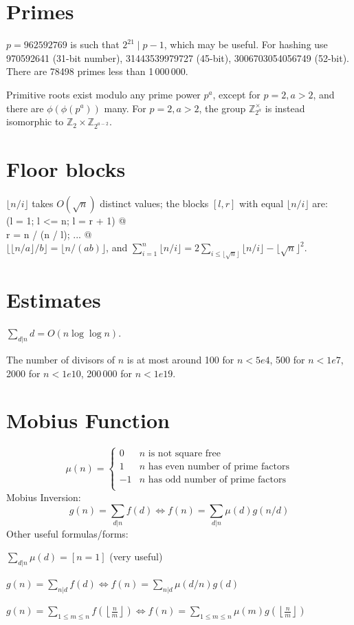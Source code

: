 \section{Primes}
	$p=962592769$ is such that $2^{21} \mid p-1$, which may be useful. For hashing
	use 970592641 (31-bit number), 31443539979727 (45-bit), 3006703054056749
	(52-bit). There are 78498 primes less than 1\,000\,000.

	Primitive roots exist modulo any prime power $p^a$, except for $p = 2, a > 2$, and there are $\phi(\phi(p^a))$ many.
	For $p = 2, a > 2$, the group $\mathbb Z_{2^a}^\times$ is instead isomorphic to $\mathbb Z_2 \times \mathbb Z_{2^{a-2}}$.

\section{Floor blocks}
	$\lfloor n/i \rfloor$ takes $O(\sqrt n)$ distinct values; the blocks $[l, r]$ with equal $\lfloor n/i \rfloor$ are:\\
	\verb@for (l = 1; l <= n; l = r + 1) {@\\
	\verb@  r = n / (n / l); ... }@\\
	$\lfloor \lfloor n/a \rfloor / b \rfloor = \lfloor n/(ab) \rfloor$, and
	$\sum_{i=1}^{n} \lfloor n/i \rfloor = 2 \sum_{i \le \lfloor\sqrt n\rfloor} \lfloor n/i \rfloor - \lfloor\sqrt n\rfloor^2$.

\section{Estimates}
	$\sum_{d|n} d = O(n \log \log n)$.

	The number of divisors of $n$ is at most around 100 for $n < 5e4$, 500 for $n < 1e7$, 2000 for $n < 1e10$, 200\,000 for $n < 1e19$.

\section{Mobius Function}
\[
	\mu(n) = \begin{cases} 0 & n \textrm{ is not square free}\\ 1 & n \textrm{ has even number of prime factors}\\ -1 & n \textrm{ has odd number of prime factors}\\\end{cases}
\]
  Mobius Inversion:
  \[ g(n) = \sum_{d|n} f(d) \Leftrightarrow f(n) = \sum_{d|n} \mu(d)g(n/d) \]
  Other useful formulas/forms:

  $ \sum_{d | n} \mu(d) = [ n = 1] $ (very useful)

  $ g(n) = \sum_{n|d} f(d) \Leftrightarrow f(n) = \sum_{n|d} \mu(d/n)g(d)$

 $ g(n) = \sum_{1 \leq m \leq n} f(\left\lfloor\frac{n}{m}\right \rfloor ) \Leftrightarrow f(n) = \sum_{1\leq m\leq n} \mu(m)g(\left\lfloor\frac{n}{m}\right\rfloor)$
